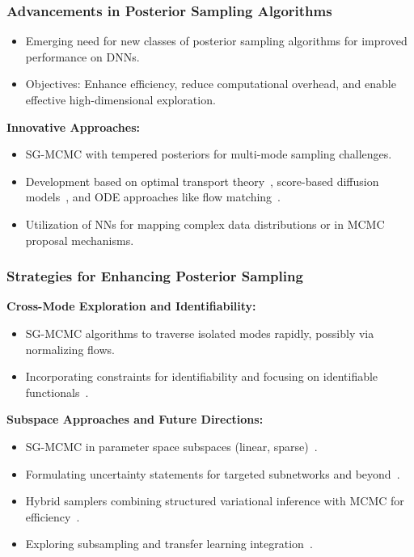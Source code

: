 \documentclass[9pt]{beamer}
\begin{document}
\begin{frame}
\frametitle{Advancements in Posterior Sampling Algorithms}

\begin{itemize}
    \item Emerging need for new classes of posterior sampling algorithms for improved performance on DNNs.
    \item Objectives: Enhance efficiency, reduce computational overhead, and enable effective high-dimensional exploration.
\end{itemize}

\textbf{Innovative Approaches:}
\begin{itemize}
    \item SG-MCMC with tempered posteriors for multi-mode sampling challenges.
    \item Development based on optimal transport theory~\citep{villani2021topics}, score-based diffusion models~\citep{song2020score}, and ODE approaches like flow matching~\citep{lipman2022flow}.
    \item Utilization of NNs for mapping complex data distributions or in MCMC proposal mechanisms.
\end{itemize}

\end{frame}

\begin{frame}
\frametitle{Strategies for Enhancing Posterior Sampling}

\textbf{Cross-Mode Exploration and Identifiability:}
\begin{itemize}
    \item SG-MCMC algorithms to traverse isolated modes rapidly, possibly via normalizing flows.
    \item Incorporating constraints for identifiability and focusing on identifiable functionals~\citep{gu2023}.
\end{itemize}

\textbf{Subspace Approaches and Future Directions:}
\begin{itemize}
    \item SG-MCMC in parameter space subspaces (linear, sparse)~\citep{izmailov2020,li2023training}.
    \item Formulating uncertainty statements for targeted subnetworks and beyond~\citep{dold2024}.
    \item Hybrid samplers combining structured variational inference with MCMC for efficiency~\citep{alexos2022structured}.
    \item Exploring subsampling and transfer learning integration~\citep{kirichenko2023last}.
\end{itemize}

\end{frame}
\end{document}
